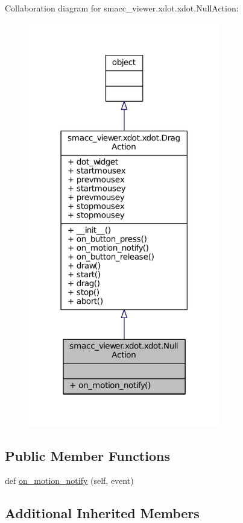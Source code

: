 Collaboration diagram for smacc\+\_\+viewer.\+xdot.\+xdot.\+Null\+Action\+:
\nopagebreak
\begin{figure}[H]
\begin{center}
\leavevmode
\includegraphics[width=237pt]{classsmacc__viewer_1_1xdot_1_1xdot_1_1NullAction__coll__graph}
\end{center}
\end{figure}
\subsection*{Public Member Functions}
\begin{DoxyCompactItemize}
\item 
def \hyperlink{classsmacc__viewer_1_1xdot_1_1xdot_1_1NullAction_ae77c1e1dd5fdd7f6bc71715a2c277f00}{on\+\_\+motion\+\_\+notify} (self, event)
\end{DoxyCompactItemize}
\subsection*{Additional Inherited Members}


